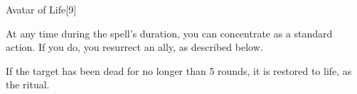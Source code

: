 \begin{spellsection}{Avatar of Life}[9]
    \begin{spellheader}
    \end{spellheader}
    \begin{spellcontent}
        \begin{spelltargetinginfo}
        \end{spelltargetinginfo}
        \begin{spelleffects}
            \spelleffect At any time during the spell's duration, you can concentrate as a standard action. If you do, you resurrect an ally, as described below.
            \spelldur \durlong
        \end{spelleffects}
    \end{spellcontent}
    \begin{spellsubcontent}
        \begin{spelltargetinginfo}
        \end{spelltargetinginfo}
        \begin{spelleffects}
            \spelleffect If the target has been dead for no longer than 5 rounds, it is restored to life, as the  ritual.
            \spelldur \durlong
        \end{spelleffects}
    \end{spellsubcontent}
    \begin{spellfooter}
        \miscastexplode
    \end{spellfooter}
\end{spellsection}

